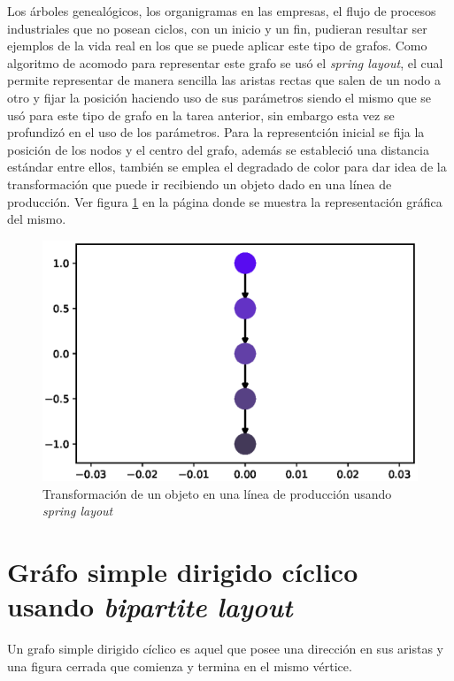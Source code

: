 \documentclass{article}
\begin{document}
Los árboles genealógicos, los organigramas en las empresas, el flujo de procesos industriales que no posean ciclos, con un inicio y un fin, pudieran resultar ser ejemplos de la vida real en los que se puede aplicar este tipo de grafos. Como algoritmo de acomodo para representar este grafo se usó el \textit{spring layout}, el cual permite representar de manera sencilla las aristas rectas que salen de un nodo a otro y fijar la posición haciendo uso de sus parámetros \cite{layout} siendo el mismo que se usó para este tipo de grafo en la tarea anterior, sin embargo esta vez se profundizó en el uso de los parámetros. Para la representción inicial se fija la posición de los nodos y el centro del grafo, además se estableció una distancia estándar entre ellos, también se emplea el degradado de color para dar idea de la transformación que puede ir recibiendo un objeto dado en una línea de producción. Ver figura \ref{fig:Fig04} en la página \pageref{fig:Fig04} donde se muestra la representación gráfica del mismo.

\newpage


\begin{figure}[h]
    \centering
    \includegraphics[scale=0.6]{imagenes1/Fig04.eps}
    \caption{Transformación de un objeto en una línea de producción usando \textit{spring layout} }
    \label{fig:Fig04}
\end{figure}


\section{Gráfo simple dirigido cíclico usando \textit{bipartite layout} }

Un grafo simple dirigido cíclico es aquel que posee una dirección en sus aristas y una figura cerrada que comienza y  termina en el mismo vértice.
\end{document}
